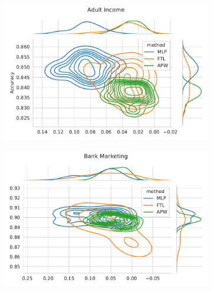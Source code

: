 \begin{figure}
\centering
\caption{Metric distribution optimizing Accuracy and Equalized Odds in comparison with Fair Transition Loss across multiple resample runs. Corresponding values available at Table~\ref{tab:complete_acc_odds}.}
\label{fig:complete_acc_odds}
\begin{subfigure}{.45\linewidth}
    \includegraphics[width=1\linewidth]{images/pareto_acc_odds_adult.pdf}
\end{subfigure}
\begin{subfigure}{.45\linewidth}
    \includegraphics[width=1\linewidth]{images/pareto_acc_odds_bank.pdf}
\end{subfigure}


\end{figure}
